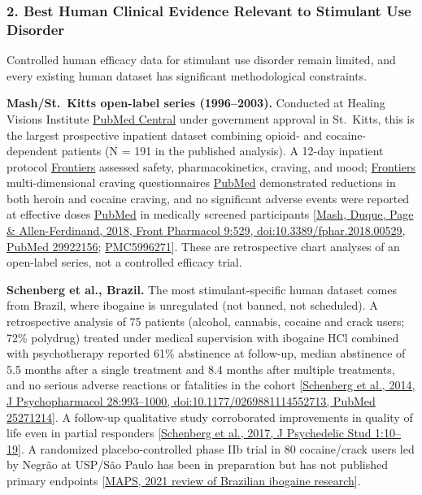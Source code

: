 \subsubsection{2. Best Human Clinical Evidence Relevant to Stimulant Use Disorder}\label{20_ibogaine-best-human-clinical-evidence-relevant-to-stimulant-use-disorder}

Controlled human efficacy data for stimulant use disorder remain limited, and every existing human dataset has significant methodological constraints.

\textbf{Mash/St.~Kitts open-label series (1996--2003).} Conducted at Healing Visions Institute \href{https://pmc.ncbi.nlm.nih.gov/articles/PMC5996271/}{PubMed Central} under government approval in St.~Kitts, this is the largest prospective inpatient dataset combining opioid- and cocaine-dependent patients (N = 191 in the published analysis). A 12-day inpatient protocol \href{https://www.frontiersin.org/journals/pharmacology/articles/10.3389/fphar.2018.00529/full}{Frontiers} assessed safety, pharmacokinetics, craving, and mood; \href{https://www.frontiersin.org/journals/pharmacology/articles/10.3389/fphar.2018.00529/full}{Frontiers} multi-dimensional craving questionnaires \href{https://pubmed.ncbi.nlm.nih.gov/29922156/}{PubMed} demonstrated reductions in both heroin and cocaine craving, and no significant adverse events were reported at effective doses \href{https://pubmed.ncbi.nlm.nih.gov/29922156/}{PubMed} in medically screened participants {[}\href{https://pubmed.ncbi.nlm.nih.gov/29922156/}{Mash, Duque, Page \& Allen-Ferdinand, 2018, Front Pharmacol 9:529, doi:10.3389/fphar.2018.00529, PubMed 29922156}; \href{https://pmc.ncbi.nlm.nih.gov/articles/PMC5996271/}{PMC5996271}{]}. These are retrospective chart analyses of an open-label series, not a controlled efficacy trial.

\textbf{Schenberg et al., Brazil.} The most stimulant-specific human dataset comes from Brazil, where ibogaine is unregulated (not banned, not scheduled). A retrospective analysis of 75 patients (alcohol, cannabis, cocaine and crack users; 72\% polydrug) treated under medical supervision with ibogaine HCl combined with psychotherapy reported 61\% abstinence at follow-up, median abstinence of 5.5 months after a single treatment and 8.4 months after multiple treatments, and no serious adverse reactions or fatalities in the cohort {[}\href{https://pubmed.ncbi.nlm.nih.gov/25271214/}{Schenberg et al., 2014, J Psychopharmacol 28:993--1000, doi:10.1177/0269881114552713, PubMed 25271214}{]}. A follow-up qualitative study corroborated improvements in quality of life even in partial responders {[}\href{https://akjournals.com/view/journals/2054/1/1/article-p10.xml}{Schenberg et al., 2017, J Psychedelic Stud 1:10--19}{]}. A randomized placebo-controlled phase IIb trial in 80 cocaine/crack users led by Negrão at USP/São Paulo has been in preparation but has not published primary endpoints {[}\href{https://maps.org/news/bulletin/the-case-of-brazil-after-ayahuasca-ibogaine-opens-up-opportunity-for-first-class-research-in-the-global-south/}{MAPS, 2021 review of Brazilian ibogaine research}{]}.

